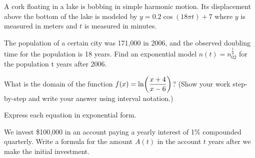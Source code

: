 \documentclass[11pt,answers]{exam}
\let\originalleft\left
\let\originalright\right
\renewcommand{\left}{\mathopen{}\mathclose\bgroup\originalleft}
\renewcommand{\right}{\aftergroup\egroup\originalright}
\begin{document}
\begin{questions}
\newpage
\question A cork floating in a lake is bobbing in simple harmonic motion. Its displacement above the bottom of the lake is modeled by
$\displaystyle y = 0.2 \cos (18\pi t) + 7$
where $y$ is measured in meters and $t$ is measured in minutes.
\question[2] The population of a certain city was 171,000 in 2006, and the observed doubling time for the population is 18 years. Find an exponential model 
$\displaystyle n(t) = n_02^{\frac{t}{a}}$
 for the population t years after 2006.
 
	\dotfill
\question[2] What is the domain of the function 
$\displaystyle f(x) = \ln \left ( \frac{x + 4}{x - 6}\right )$?
 (Show your work step-by-step and write your answer using interval notation.) 
 
 \fillwithdottedlines{4cm}
\question Express each equation in exponential form.
 
 \question[2] We invest \$100,000 in an account paying a yearly interest of 1\% compounded quarterly. Write a formula for the amount $A(t)$ in the account $t$ years after we make the initial investment.
  \fillwithdottedlines{2cm}
 
\end{questions}
\newpage
\end{document}
